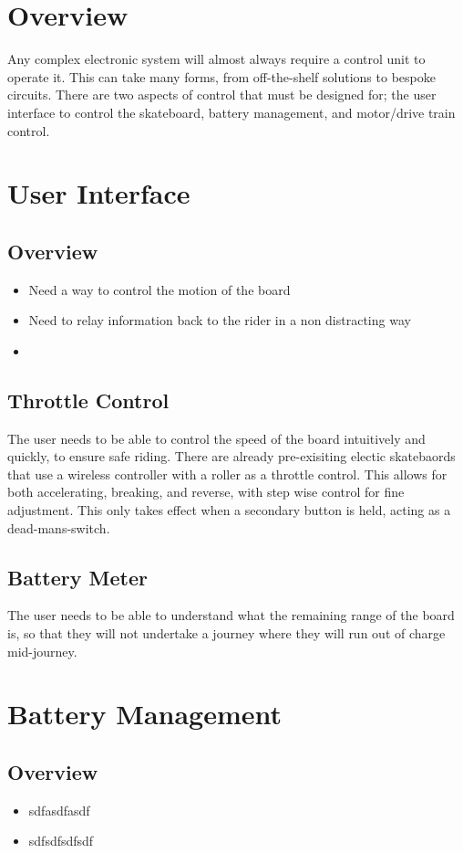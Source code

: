 \documentclass{article}
\begin{document}
\section{Overview}
	Any complex electronic system will almost always require a control unit to operate it. This can take many forms, from off-the-shelf solutions to bespoke circuits.
	There are two aspects of control that must be designed for; the user interface to control the skateboard, battery management, and motor/drive train control.
\section{User Interface}
	\subsection{Overview}
		\begin{itemize}
			\item Need a way to control the motion of the board
			\item Need to relay information back to the rider in a non distracting way
			\item 
		\end{itemize}
	\subsection{Throttle Control}
		The user needs to be able to control the speed of the board intuitively and quickly, to ensure safe riding.
		There are already pre-exisiting electic skatebaords that use a wireless controller with a roller as a throttle control. 
		This allows for both accelerating, breaking, and reverse, with step wise control for fine adjustment.
		This only takes effect when a secondary button is held, acting as a dead-mans-switch.
	\subsection{Battery Meter}
		The user needs to be able to understand what the remaining range of the board is, so that they will not undertake a journey where they will run out of charge mid-journey.
\section{Battery Management}
	\subsection{Overview}
		\begin{itemize}
			\item sdfasdfasdf
			\item sdfsdfsdfsdf
		\end{itemize}
\end{document}

